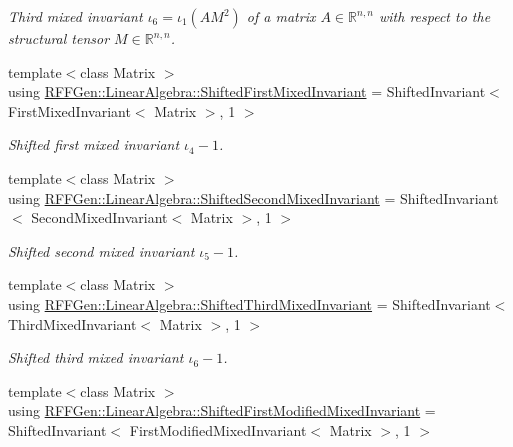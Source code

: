 \begin{DoxyCompactItemize}
\begin{DoxyCompactList}\small\item\em Third mixed invariant $ \iota_6=\iota_1(AM^2) $ of a matrix $A\in\mathbb{R}^{n,n}$ with respect to the structural tensor $M\in\mathbb{R}^{n,n}$. \end{DoxyCompactList}\item 
\hypertarget{group__LinearAlgebraGroup_ga864cde216d56b082449e33422f7fcc76}{{\footnotesize template$<$class Matrix $>$ }\\using \hyperlink{group__LinearAlgebraGroup_ga864cde216d56b082449e33422f7fcc76}{R\-F\-F\-Gen\-::\-Linear\-Algebra\-::\-Shifted\-First\-Mixed\-Invariant} = Shifted\-Invariant$<$ First\-Mixed\-Invariant$<$ Matrix $>$, 1 $>$}\label{group__LinearAlgebraGroup_ga864cde216d56b082449e33422f7fcc76}

\begin{DoxyCompactList}\small\item\em Shifted first mixed invariant $ \iota_4 - 1 $. \end{DoxyCompactList}\item 
\hypertarget{group__LinearAlgebraGroup_ga023b3c54182be971c7d3ba9dda15fa3d}{{\footnotesize template$<$class Matrix $>$ }\\using \hyperlink{group__LinearAlgebraGroup_ga023b3c54182be971c7d3ba9dda15fa3d}{R\-F\-F\-Gen\-::\-Linear\-Algebra\-::\-Shifted\-Second\-Mixed\-Invariant} = Shifted\-Invariant$<$ Second\-Mixed\-Invariant$<$ Matrix $>$, 1 $>$}\label{group__LinearAlgebraGroup_ga023b3c54182be971c7d3ba9dda15fa3d}

\begin{DoxyCompactList}\small\item\em Shifted second mixed invariant $ \iota_5 - 1 $. \end{DoxyCompactList}\item 
\hypertarget{group__LinearAlgebraGroup_ga5923cfb191178d5edacef49c687462ae}{{\footnotesize template$<$class Matrix $>$ }\\using \hyperlink{group__LinearAlgebraGroup_ga5923cfb191178d5edacef49c687462ae}{R\-F\-F\-Gen\-::\-Linear\-Algebra\-::\-Shifted\-Third\-Mixed\-Invariant} = Shifted\-Invariant$<$ Third\-Mixed\-Invariant$<$ Matrix $>$, 1 $>$}\label{group__LinearAlgebraGroup_ga5923cfb191178d5edacef49c687462ae}

\begin{DoxyCompactList}\small\item\em Shifted third mixed invariant $ \iota_6 - 1 $. \end{DoxyCompactList}\item 
\hypertarget{group__LinearAlgebraGroup_ga55cd39bf5ba0bab6af5f0a1d26a040e4}{{\footnotesize template$<$class Matrix $>$ }\\using \hyperlink{group__LinearAlgebraGroup_ga55cd39bf5ba0bab6af5f0a1d26a040e4}{R\-F\-F\-Gen\-::\-Linear\-Algebra\-::\-Shifted\-First\-Modified\-Mixed\-Invariant} = Shifted\-Invariant$<$ First\-Modified\-Mixed\-Invariant$<$ Matrix $>$, 1 $>$}\label{group__LinearAlgebraGroup_ga55cd39bf5ba0bab6af5f0a1d26a040e4}


\end{DoxyCompactItemize}
